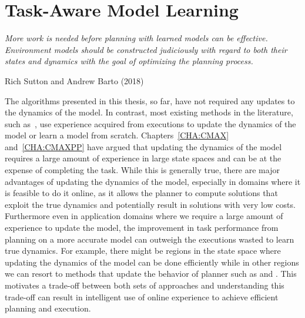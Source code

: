 
\chapter{Task-Aware Model Learning}
\label{CHA:TAML}

\epigraph{\textit{More work is needed before planning with learned
    models can be effective. Environment models should be
    constructed judiciously with regard to both their states and
    dynamics with the goal of optimizing the planning process.}}{Rich
  Sutton and Andrew Barto (2018)}

The algorithms presented in this thesis, so
far, have not required any updates to the dynamics of the model. In
contrast, most existing methods in the literature, such
as~\cite{DBLP:journals/ml/KearnsS02, DBLP:journals/jmlr/BrafmanT02,
  DBLP:conf/atal/JongS07,
  DBLP:journals/pami/DeisenrothFR15, DBLP:conf/icml/AbbeelQN06,
  DBLP:conf/aaai/Jiang18, rastogi2018sample}, use experience
acquired from executions to update the dynamics of the model or learn
a model from scratch.
Chapters~\ref{CHA:CMAX} and~\ref{CHA:CMAXPP} have
argued that updating the dynamics of the model requires a large amount
of experience in large state spaces and can be at the expense of
completing the task. While this is generally true, there are major
advantages of updating the dynamics of the model, especially in
domains where it
is feasible to do it online, as it allows the planner to compute
solutions that exploit the true dynamics and potentially result in
solutions with very low costs. Furthermore even in application domains
where we require a large amount of experience to update the model,
the improvement in task performance from planning on a more accurate
model can outweigh the executions wasted to learn true dynamics. For
example, there might be regions in the state space where updating the
dynamics of the model can be done efficiently while in other regions
we can resort to methods that update the behavior of planner such as
\cmax{} and \cmaxpp{}. This motivates a trade-off between both sets of
approaches and understanding this trade-off can result in intelligent
use of online experience to achieve efficient planning and
execution.

